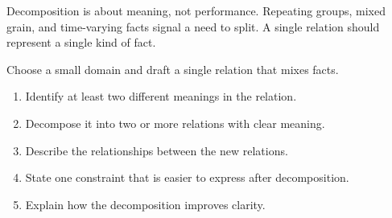 \begin{chaptersummary}
Decomposition is about meaning, not performance.
Repeating groups, mixed grain, and time-varying facts signal a need to split.
A single relation should represent a single kind of fact.
\end{chaptersummary}

\begin{exercisebox}
Choose a small domain and draft a single relation that mixes facts.
\begin{enumerate}[label=\arabic*.]
  \item Identify at least two different meanings in the relation.
  \item Decompose it into two or more relations with clear meaning.
  \item Describe the relationships between the new relations.
  \item State one constraint that is easier to express after decomposition.
  \item Explain how the decomposition improves clarity.
\end{enumerate}
\end{exercisebox}
